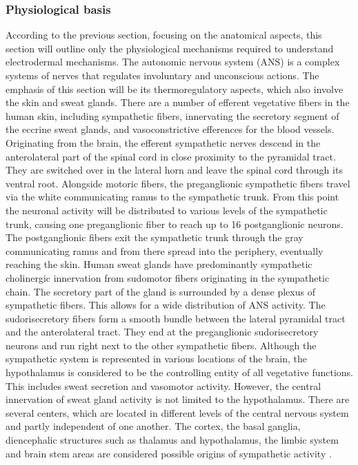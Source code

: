 \subsubsection{Physiological basis}
According to the previous section, focusing on the anatomical aspects, this section will outline only the physiological mechanisms required to understand electrodermal mechanisms. 
The autonomic nervous system (ANS) is a complex systems of nerves that regulates involuntary and unconscious actions. The emphasis of this section will be its thermoregulatory aspects, which also involve the skin and sweat glands. 
There are a number of efferent vegetative fibers in the human skin, including sympathetic fibers, innervating the secretory segment of the eccrine sweat glands, and vasoconstrictive efferences for the blood vessels. Originating from the brain, the efferent sympathetic nerves descend in the anterolateral part of the spinal cord in close proximity to the pyramidal tract. They are switched over in the lateral horn and leave the spinal cord through its ventral root. Alongside motoric fibers, the preganglionic sympathetic fibers travel via the white communicating ramus to the sympathetic trunk. From this point the neuronal activity will be distributed to various levels of the sympathetic trunk, causing one preganglionic fiber to reach up to 16 postganglionic neurons. The postganglionic fibers exit the sympathetic trunk through the gray communicating ramus and from there spread into the periphery, eventually reaching the skin.
Human sweat glands have predominantly sympathetic cholinergic innervation from sudomotor fibers originating in the sympathetic chain. The secretory part of the gland is surrounded by a dense plexus of sympathetic fibers. This allows for a wide distribution of ANS activity. The sudorisecretory fibers form a smooth bundle between the lateral pyramidal tract and the anterolateral tract. They end at the preganglionic sudorisecretory neurons and run right next to the other sympathetic fibers.  Although the sympathetic system is represented in various locations of the brain, the hypothalamus is considered to be the controlling entity of all vegetative functions. This includes sweat secretion and vasomotor activity. However, the central innervation of sweat gland activity is not limited to the hypothalamus. There are several centers, which are located in different levels of the central nervous system and partly independent of one another. The cortex, the basal ganglia, diencephalic structures such as thalamus and hypothalamus, the limbic system and brain stem areas are considered possible origins of sympathetic activity \citep{boucsein2013electrodermal}.

